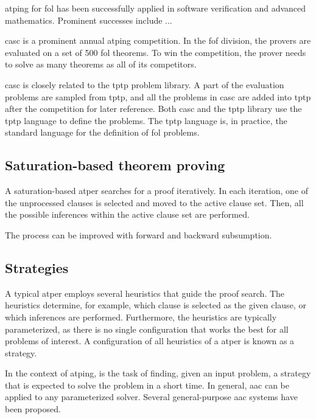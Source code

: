 \Gls{atping} for \gls{fol} has been successfully applied in software verification and advanced mathematics.
Prominent successes include ...

\Gls{casc} is a prominent annual \gls{atping} competition.
In the \gls{fof} division, the provers are evaluated on a set of 500 \gls{fol} theorems.
To win the competition, the prover needs to solve as many theorems as all of its competitors.

\Gls{casc} is closely related to the \gls{tptp} problem library.
A part of the evaluation problems are sampled from \gls{tptp}, and all the problems in \gls{casc} are added into \gls{tptp} after the competition for later reference.
Both \gls{casc} and the \gls{tptp} library use the \gls{tptp} language to define the problems.
The \gls{tptp} language is, in practice, the standard language for the definition of \gls{fol} problems.

\subsection{Saturation-based theorem proving}

A saturation-based \gls{atper} searches for a proof iteratively.
In each iteration, one of the unprocessed clauses is selected and moved to the active clause set.
Then, all the possible inferences within the active clause set are performed.

The process can be improved with forward and backward subsumption.

\subsection{Strategies}

A typical \gls{atper} employs several heuristics that guide the proof search.
The heuristics determine, for example, which clause is selected as the given clause, or which inferences are performed.
Furthermore, the heuristics are typically parameterized, as there is no single configuration that works the best for all problems of interest.
A configuration of all heuristics of a \gls{atper} is known as a strategy.

In the context of \gls{atping},  is the task of finding, given an input problem, a strategy that is expected to solve the problem in a short time.
In general, \gls{aac} can be applied to any parameterized solver.
Several general-purpose \gls{aac} systems have been proposed.

